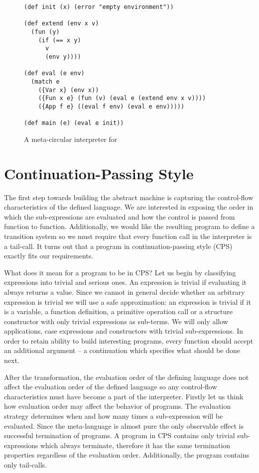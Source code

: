 \begin{figure}
    \centering
    \begin{lstlisting}
(def init (x) (error "empty environment"))

(def extend (env x v)
  (fun (y)  
    (if (== x y)
      v
      (env y))))

(def eval (e env)
  (match e
    ({Var x} (env x))
    ({Fun x e} (fun (v) (eval e (extend env x v))))
    ({App f e} ((eval f env) (eval e env)))))
        
(def main (e) (eval e init))
    \end{lstlisting}
    \caption{A meta-circular interpreter for \LC{}}
    \label{fig:lambda-calc-interp}
\end{figure}

\section{Continuation-Passing Style}
The first step towards building the abstract machine is capturing the control-flow characteristics of the defined language.
We are interested in exposing the order in which the sub-expressions are evaluated and how the control is passed from function to function.
Additionally, we would like the resulting program to define a transition system so we must require that every function call in the interpreter is a tail-call.
It turns out that a program in continuation-passing style (CPS) exactly fits our requirements.

What does it mean for a program to be in CPS?
Let us begin by classifying expressions into trivial and serious ones.
An expression is trivial if evaluating it always returns a value.
Since we cannot in general decide whether an arbitrary expression is trivial we will use a safe approximation: an expression is trivial if it is a variable, a function definition, a primitive operation call or a structure constructor with only trivial expressions as sub-terms.
We will only allow applications, case expressions and constructors with trivial sub-expressions.
In order to retain ability to build interesting programs, every function should accept an additional argument -- a continuation which specifies what should be done next.

After the transformation, the evaluation order of the defining language does not affect the evaluation order of the defined language so any control-flow characteristics must have become a part of the interpreter.
Firstly let us think how evaluation order may affect the behavior of programs.
The evaluation strategy determines when and how many times a sub-expression will be evaluated.
Since the meta-language is almost pure the only observable effect is successful termination of programs.
A program in CPS contains only trivial sub-expressions which always terminate, therefore it has the same termination properties regardless of the evaluation order.
Additionally, the program contains only tail-calls.

